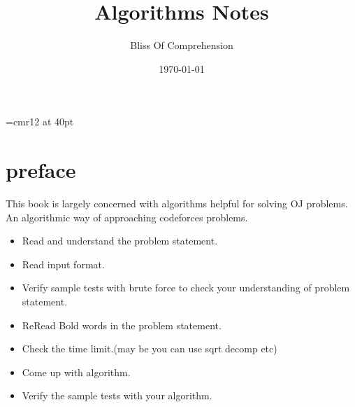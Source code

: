 \documentclass[a4paper,12pt]{report}
\begin{document}
\font\TitleF=cmr12 at 40pt
\title{\TitleF Algorithms Notes}
\author{Bliss Of Comprehension}
\date{\today}
\maketitle

\tableofcontents

\chapter*{preface}

This book is largely concerned with algorithms helpful for solving OJ problems.\\
An algorithmic way of approaching codeforces problems.
\begin{itemize}
	\item Read and understand the problem statement.
	\item Read input format.
	\item Verify sample tests with brute force to check your understanding of problem statement.
	\item ReRead Bold words in the problem statement.
	\item Check the time limit.(may be you can use sqrt decomp etc)
	\item Come up with algorithm.
	\item Verify the sample tests with your algorithm.
\end{itemize}










\end{document}
